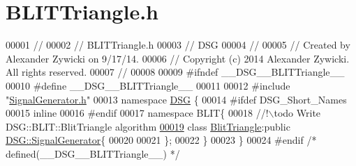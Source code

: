 \hypertarget{_b_l_i_t_triangle_8h_source}{\section{B\+L\+I\+T\+Triangle.\+h}
\label{_b_l_i_t_triangle_8h_source}
}

\begin{DoxyCode}
00001 \textcolor{comment}{//}
00002 \textcolor{comment}{//  BLITTriangle.h}
00003 \textcolor{comment}{//  DSG}
00004 \textcolor{comment}{//}
00005 \textcolor{comment}{//  Created by Alexander Zywicki on 9/17/14.}
00006 \textcolor{comment}{//  Copyright (c) 2014 Alexander Zywicki. All rights reserved.}
00007 \textcolor{comment}{//}
00008 
00009 \textcolor{preprocessor}{#ifndef \_\_DSG\_\_BLITTriangle\_\_}
00010 \textcolor{preprocessor}{#define \_\_DSG\_\_BLITTriangle\_\_}
00011 
00012 \textcolor{preprocessor}{#include "\hyperlink{_signal_generator_8h}{SignalGenerator.h}"}
00013 \textcolor{keyword}{namespace }\hyperlink{namespace_d_s_g}{DSG} \{
00014 \textcolor{preprocessor}{#ifdef DSG\_Short\_Names}
00015     \textcolor{keyword}{inline}
00016 \textcolor{preprocessor}{#endif}
00017     \textcolor{keyword}{namespace }BLIT\{\textcolor{comment}{}
00018 \textcolor{comment}{        //!\(\backslash\)todo Write DSG::BLIT::BlitTriangle algorithm}
\hypertarget{_b_l_i_t_triangle_8h_source_l00019}{}\hyperlink{class_d_s_g_1_1_b_l_i_t_1_1_blit_triangle}{00019} \textcolor{comment}{}        \textcolor{keyword}{class }\hyperlink{class_d_s_g_1_1_b_l_i_t_1_1_blit_triangle}{BlitTriangle}:\textcolor{keyword}{public} \hyperlink{class_d_s_g_1_1_signal_generator}{DSG::SignalGenerator}\{
00020 
00021         \};
00022     \}
00023 \}
00024 \textcolor{preprocessor}{#endif }\textcolor{comment}{/* defined(\_\_DSG\_\_BLITTriangle\_\_) */}\textcolor{preprocessor}{}
\end{DoxyCode}
